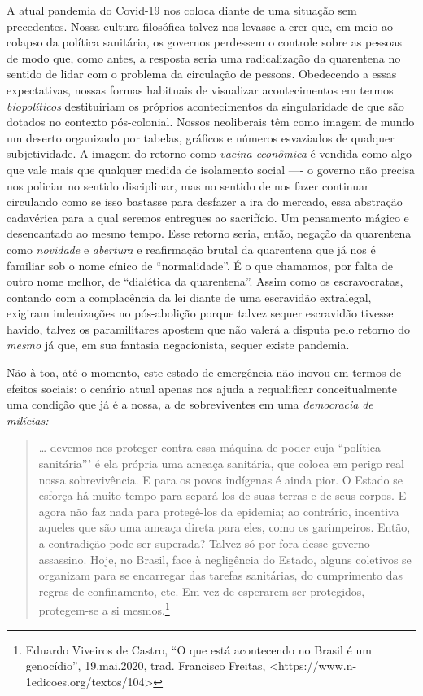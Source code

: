A atual pandemia do Covid-19 nos coloca diante de uma situação sem
precedentes. Nossa cultura filosófica talvez nos levasse a crer que, em
meio ao colapso da política sanitária, os governos perdessem o controle
sobre as pessoas de modo que, como antes, a resposta seria uma
radicalização da quarentena no sentido de lidar com o problema da
circulação de pessoas. Obedecendo a essas expectativas, nossas formas
habituais de visualizar acontecimentos em termos \textit{biopolíticos}
destituiriam os próprios acontecimentos da singularidade de que são
dotados no contexto pós-colonial. Nossos neoliberais têm como imagem de
mundo um deserto organizado por tabelas, gráficos e números esvaziados
de qualquer subjetividade. A imagem do retorno como \textit{vacina
econômica} é vendida como algo que vale mais que qualquer medida de
isolamento social ---- o governo não precisa nos policiar no sentido
disciplinar, mas no sentido de nos fazer continuar circulando como se
isso bastasse para desfazer a ira do mercado, essa abstração cadavérica
para a qual seremos entregues ao sacrifício. Um pensamento mágico e
desencantado ao mesmo tempo. Esse retorno seria, então, negação da
quarentena como \textit{novidade} e \textit{abertura} e reafirmação brutal
da quarentena que já nos é familiar sob o nome cínico de
``normalidade''. É o que chamamos, por falta de outro nome melhor, de
``dialética da quarentena''. Assim como os escravocratas, contando com a
complacência da lei diante de uma escravidão extralegal, exigiram
indenizações no pós-abolição porque talvez sequer escravidão tivesse
havido, talvez os paramilitares apostem que não valerá a disputa pelo
retorno do \textit{mesmo} já que, em sua fantasia negacionista, sequer
existe pandemia.

Não à toa, até o momento, este estado de emergência não inovou em termos
de efeitos sociais: o cenário atual apenas nos ajuda a requalificar
conceitualmente uma condição que já é a nossa, a de sobreviventes em uma
\textit{democracia} \textit{de milícias:}

\begin{quote}
\ldots{} devemos nos proteger contra essa máquina de poder cuja ``política
sanitária''' é ela própria uma ameaça sanitária, que coloca em perigo
real nossa sobrevivência. E para os povos indígenas é ainda pior. O
Estado se esforça há muito tempo para separá-los de suas terras e de
seus corpos. E agora não faz nada para protegê-los da epidemia; ao
contrário, incentiva aqueles que são uma ameaça direta para eles, como
os garimpeiros. Então, a contradição pode ser superada? Talvez só por
fora desse governo assassino. Hoje, no Brasil, face à negligência do
Estado, alguns coletivos se organizam para se encarregar das tarefas
sanitárias, do cumprimento das regras de confinamento, etc. Em vez de
esperarem ser protegidos, protegem-se a si mesmos.\footnote{Eduardo
  Viveiros de Castro, ``O que está acontecendo no Brasil é um
  genocídio'', 19.mai.2020, trad. Francisco Freitas,
  \textless{}https://www.n-1edicoes.org/textos/104\textgreater{}}
\end{quote}

